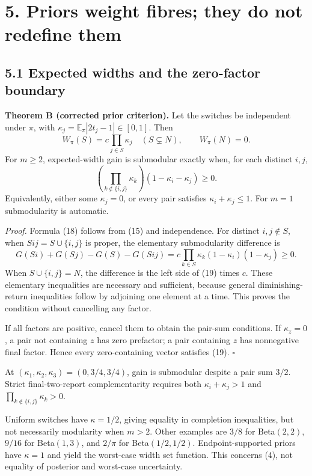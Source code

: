 \documentclass[
  british,
  11pt,
  a4paper,
]{article}
\begin{document}
\section{5. Priors weight fibres; they do not redefine
them}\label{priors-weight-fibres-they-do-not-redefine-them}

\subsection{5.1 Expected widths and the zero-factor
boundary}\label{expected-widths-and-the-zero-factor-boundary}

\textbf{Theorem B (corrected prior criterion).} Let the switches be
independent under \(\pi\), with
\(\kappa_j=\mathbb E_\pi|2t_j-1|\in[0,1]\). Then \[
W_\pi(S)=c\prod_{j\in S}\kappa_j\quad(S\subsetneq N),\qquad W_\pi(N)=0.
\tag{18}
\] For \(m\ge2\), expected-width gain is submodular exactly when, for
each distinct \(i,j\), \[
\left(\prod_{k\notin\{i,j\}}\kappa_k\right)(1-\kappa_i-\kappa_j)\ge0.
\tag{19}
\] Equivalently, either some \(\kappa_j=0\), or every pair satisfies
\(\kappa_i+\kappa_j\le1\). For \(m=1\) submodularity is automatic.

\emph{Proof.} Formula (18) follows from (15) and independence. For
distinct \(i,j\notin S\), when \(Sij=S\cup\{i,j\}\) is proper, the
elementary submodularity difference is \[
G(Si)+G(Sj)-G(S)-G(Sij)
=c\prod_{k\in S}\kappa_k(1-\kappa_i)(1-\kappa_j)\ge0.
\] When \(S\cup\{i,j\}=N\), the difference is the left side of (19)
times \(c\). These elementary inequalities are necessary and sufficient,
because general diminishing-return inequalities follow by adjoining one
element at a time. This proves the condition without cancelling any
factor.

If all factors are positive, cancel them to obtain the pair-sum
conditions. If \(\kappa_z=0\), a pair not containing \(z\) has zero
prefactor; a pair containing \(z\) has nonnegative final factor. Hence
every zero-containing vector satisfies (19). \(\square\)

At \((\kappa_1,\kappa_2,\kappa_3)=(0,3/4,3/4)\), gain is submodular
despite a pair sum \(3/2\). Strict final-two-report complementarity
requires both \(\kappa_i+\kappa_j>1\) and
\(\prod_{k\notin\{i,j\}}\kappa_k>0\).

Uniform switches have \(\kappa=1/2\), giving equality in completion
inequalities, but not necessarily modularity when \(m>2\). Other
examples are \(3/8\) for Beta\((2,2)\), \(9/16\) for Beta\((1,3)\), and
\(2/\pi\) for Beta\((1/2,1/2)\). Endpoint-supported priors have
\(\kappa=1\) and yield the worst-case width set function. This concerns
(4), not equality of posterior and worst-case uncertainty.
\end{document}
